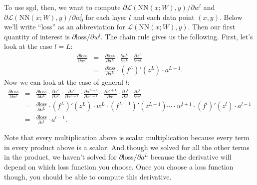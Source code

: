 To use {\sc sgd}, then, we want  to compute $\partial \mathcal{L}(\text{NN}(x;W),y) / \partial w^l$ and $\partial \mathcal{L}(\text{NN}(x;W),y) / \partial w_0^l$ for each layer $l$ and each data point $(x,y)$. Below we'll write ``loss'' as an abbreviation for $\mathcal{L}(\text{NN}(x;W),y)$. Then our first quantity of interest is $\partial \text{loss} / \partial w^l$. The chain rule gives us the following.
First, let's look at the case $l=L$:
\begin{eqnarray*}
  \frac{ \partial \text{loss} }{ \partial w^L }
  &=& \frac{ \partial \text{loss} }{ \partial a^L }
  \cdot \frac{ \partial a^L }{ \partial z^L }
  \cdot \frac{ \partial z^L }{ \partial w^L } \\
  &=& \frac{ \partial \text{loss} }{ \partial a^L } \cdot (f^L)'(z^L) \cdot a^{L-1}.
\end{eqnarray*}
Now we can look at the case of general $l$:
\begin{eqnarray*}
  \frac{ \partial \text{loss} }{ \partial w^l }
  &=& \frac{ \partial \text{loss} }{ \partial a^L }
  \cdot \frac{ \partial a^L }{ \partial z^L }
  \cdot \frac{ \partial z^L }{ \partial a^{L-1} }
  \cdot \frac{ \partial a^{L-1} }{ \partial z^{L-1} }
  \cdots
  \frac{ \partial z^{l+1} }{ \partial a^{l} }
  \cdot \frac{ \partial a^{l} }{ \partial z^l }
  \cdot \frac{ \partial z^l }{ \partial w^l } \\
  &=& \frac{ \partial \text{loss} }{ \partial a^L } \cdot (f^L)'(z^L) \cdot w^L
  \cdot (f^{L-1})'(z^{L-1})
  \cdots
  \cdot w^{l+1}
  \cdot (f^{l})'(z^{l})
  \cdot a^{l-1} \\
  &=& \frac{ \partial \text{loss} }{ \partial z^l } \cdot a^{l-1}.
\end{eqnarray*}

Note that every multiplication above is scalar multiplication because every term in every product above is a scalar. And though we solved for all the other terms in the product, we haven't solved for $\partial \text{loss} / \partial a^L$ because the derivative will depend on which loss function you choose. Once you choose a loss function though, you should be able to compute this derivative.



